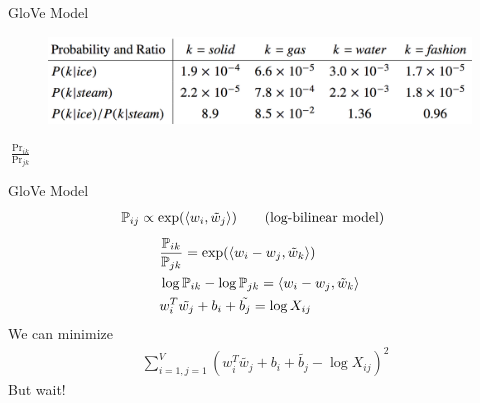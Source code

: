 



\begin{frame}{GloVe Model}
  \begin{figure}
    \includegraphics[scale=0.23]{images/glove_int.png}
  \end{figure}
  $\frac{\Pr_{ik}}{\Pr_{jk}}$
\end{frame}

\begin{frame}{GloVe Model}
  \begin{align*}
    & \mathbb{P}_{ij} \propto \exp(\langle {w_i} , {\tilde{w}_j} \rangle) \tag{log-bilinear model}
  \end{align*}
  \pause
  \begin{align*}
  & \frac{\mathbb{P}_{ik}}{\mathbb{P}_{jk}}=\exp(\langle {w_i -w_j} , {\tilde{w}_k} \rangle) \\
  & \log \mathbb{P}_{ik} - \log\mathbb{P}_{jk} = \langle {w_i -w_j} , {\tilde{w}_k} \rangle\\
  & w_i^T\tilde{w_j} +b_i + \tilde{b_j} = \log X_{ij}
  \end{align*}
  \pause
  We can minimize 
  \begin{align*}
    & \sum_{i=1,j=1}^V \left( w_i^T\tilde{w_j} +b_i + \tilde{b_j} - \log X_{ij} \right)^2
  \end{align*}
  \pause
  But wait!
\end{frame}

